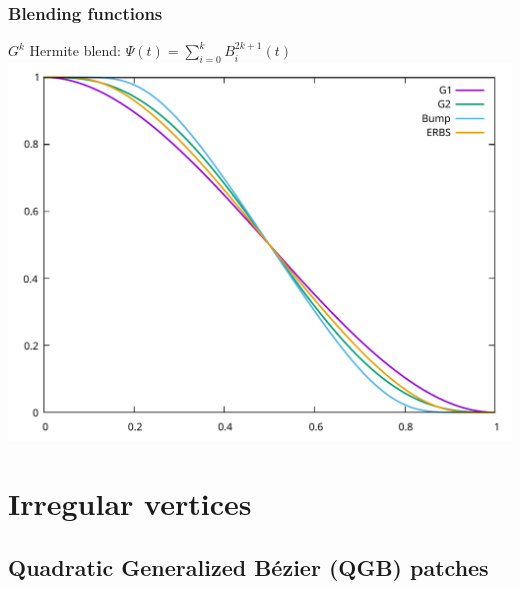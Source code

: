 \documentclass{beamer}
\begin{document}
\begin{frame}
  \frametitle{Blending functions}
  $G^k$ Hermite blend: $\Psi(t)=\sum_{i=0}^{k}B_{i}^{2k+1}(t)$
  \centering
  \includegraphics[width=.9\textwidth]{images/blend-functions.pdf}
\end{frame}

\section{Irregular vertices}

\subsection{Quadratic Generalized B\'ezier (QGB) patches}
\end{document}
